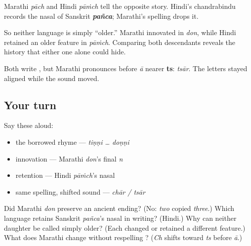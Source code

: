 \begin{grammarlens}[title={What you've built: \mr{पाच} and the nasal Hindi kept}]
Marathi \textbf{} \emph{pāch} and Hindi \textbf{} \emph{pāṁch} tell the opposite story. Hindi's chandrabindu \textbf{} records the nasal of Sanskrit \emph{\textbf{pañca}}; Marathi's spelling drops it.

So neither language is simply “older.” Marathi innovated in \emph{don}, while Hindi retained an older feature in \emph{pāṁch}. Comparing both descendants reveals the history that either one alone could hide.
\end{grammarlens}

\begin{sounds}
Both write \textbf{}, but Marathi pronounces \textbf{} before \emph{ā} nearer \textbf{ts}: \emph{tsār}. The letters stayed aligned while the sound moved.
\end{sounds}

\subsection*{Your turn}
Say these aloud:

\begin{itemize}
\raggedright
  \item the borrowed rhyme — \emph{tiṇṇi … doṇṇi}
  \item innovation — Marathi \emph{don}'s final \emph{n}
  \item retention — Hindi \emph{pāṁch}'s nasal
  \item same spelling, shifted sound — \emph{chār / tsār}
\end{itemize}

\begin{tcolorbox}[breakable,colback=teal!4,colframe=teal!35!black,title={Before you move on}]
Did Marathi \emph{don} preserve an ancient ending? (No: \emph{two} copied \emph{three}.) Which language retains Sanskrit \emph{pañca}'s nasal in writing? (Hindi.) Why can neither daughter be called simply older? (Each changed or retained a different feature.) What does Marathi change without respelling \textbf{}? (\emph{Ch} shifts toward \emph{ts} before \emph{ā}.)
\end{tcolorbox}
